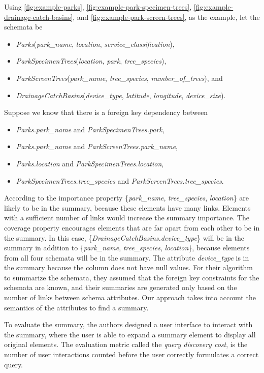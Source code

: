 Using \autoref{fig:example-parks}, \autoref{fig:example-park-specimen-trees}, \autoref{fig:example-drainage-catch-basins}, and \autoref{fig:example-park-screen-trees}, as the example, let the schemata be
\begin{itemize}
	\item[] \textit{Parks}(\textit{park\_name}, \textit{location}, \textit{service\_classification}),
	\item[] \textit{ParkSpecimenTrees}(\textit{location}, \textit{park}, \textit{tree\_species}),
	\item[] \textit{ParkScreenTrees}(\textit{park\_name}, \textit{tree\_species}, \textit{number\_of\_trees}), and
	\item[] \textit{DrainageCatchBasins}(\textit{device\_type}, \textit{latitude}, \textit{longitude}, \textit{device\_size}).
\end{itemize}
Suppose we know that there is a foreign key dependency between
\begin{itemize}
	\item[] \textit{Parks.park\_name} and \textit{ParkSpecimenTrees.park},
	\item[] \textit{Parks.park\_name} and \textit{ParkScreenTrees.park\_name},
	\item[] \textit{Parks.location} and \textit{ParkSpecimenTrees.location},
	\item[] \textit{ParkSpecimenTrees.tree\_species} and \textit{ParkScreenTrees.tree\_species}.
\end{itemize}
According to the importance property \{\textit{park\_name}, \textit{tree\_species}, \textit{location}\} are likely to be in the summary, because these elements have many links. Elements with a sufficient number of links would increase the summary importance. The coverage property encourages elements that are far apart from each other to be in the summary. In this case, \{\textit{DrainageCatchBasins.device\_type}\} will be in the summary in addition to \{\textit{park\_name}, \textit{tree\_species}, \textit{location}\}, because elements from all four schemata will be in the summary. The attribute \textit{device\_type} is in the summary because the column does not have null values. For their algorithm to summarize the schemata, they assumed that the foreign key constraints for the schemata are known, and their summaries are generated only based on the number of links between schema attributes. Our approach takes into account the semantics of the attributes to find a summary.

To evaluate the summary, the authors designed a user interface to interact with the summary, where the user is able to expand a summary element to display all original elements. The evaluation metric called the \textit{query discovery cost}, is the number of user interactions counted before the user correctly formulates a correct query.

